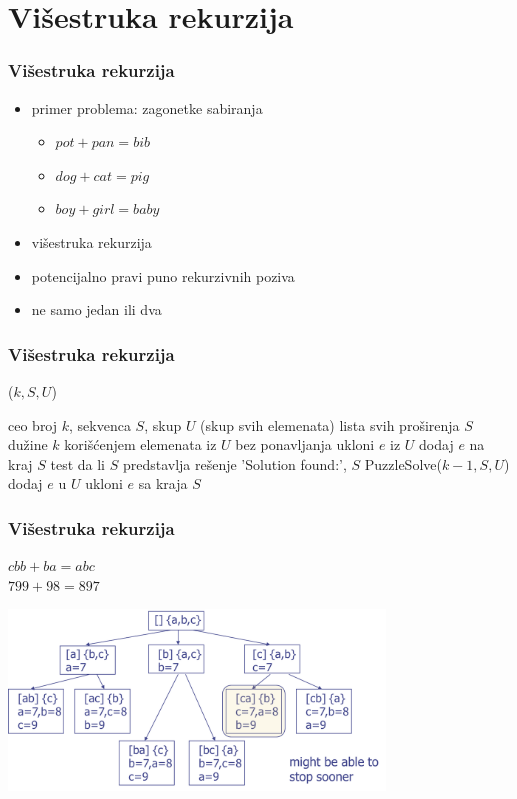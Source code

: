 \documentclass[compress]{beamer}
\begin{document}
\section[Višestruka rekurzija]{Višestruka rekurzija}
\begin{frame}[fragile]
  \frametitle{Višestruka rekurzija}
\begin{itemize}
  \item primer problema: zagonetke sabiranja
  \begin{itemize}
    \item $pot + pan = bib$
    \item $dog + cat = pig$
    \item $boy + girl = baby$
  \end{itemize}
  \item višestruka rekurzija
  \item potencijalno pravi puno rekurzivnih poziva
  \item ne samo jedan ili dva
\end{itemize}
\end{frame}

\begin{frame}[fragile,shrink=12]
  \frametitle{Višestruka rekurzija}
($k, S, U$)
\begin{algorithmic}
\REQUIRE ceo broj $k$, sekvenca $S$, skup $U$ (skup svih elemenata)
\ENSURE lista svih proširenja $S$ dužine $k$ korišćenjem elemenata iz $U$ bez ponavljanja
  \STATE ukloni $e$ iz $U$ 
  \STATE dodaj $e$ na kraj $S$
    \STATE test da li $S$ predstavlja rešenje
      \RETURN 'Solution found:', $S$
    \ENDIF
  \ELSE
    \STATE PuzzleSolve($k-1, S, U$)
    \STATE dodaj $e$ u $U$ 
    \STATE ukloni $e$ sa kraja $S$
  \ENDIF
\ENDFOR
\end{algorithmic}
\end{frame}

\begin{frame}[fragile]
  \frametitle{Višestruka rekurzija}
  $cbb + ba = abc$ \\
  $799 + 98 = 897$
  \begin{center}
    \includegraphics[width=10cm]{asp-02-pic08.png}
  \end{center}
\end{frame}
\end{document}
